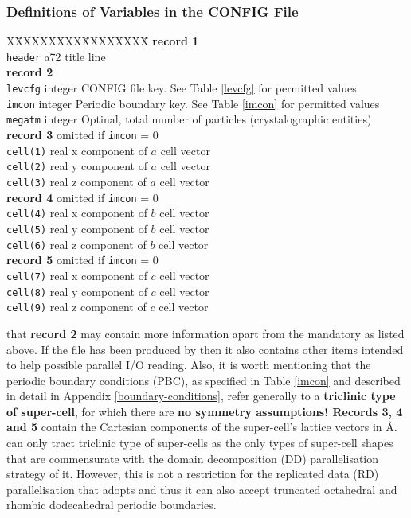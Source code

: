 \subsubsection{Definitions of Variables in the CONFIG File}

\begin{tabbing}
X\=XXXXXXXX\=XXXXXXXX\=\kill
{\bf record 1} \\
\> {\tt header}  \> a72     \> title line \\
{\bf record 2} \\
\> {\tt levcfg}  \> integer \> CONFIG file key.  See Table \ref{levcfg} for permitted values \\
\> {\tt imcon}   \> integer \> Periodic boundary key. See Table \ref{imcon} for permitted values \\
\> {\tt megatm}  \> integer \> Optinal, total number of particles (crystalographic entities) \\
{\bf record 3}   \>         \> omitted if {\tt imcon} = 0 \\
\> {\tt cell(1)} \> real    \> x component of $a$ cell vector \\
\> {\tt cell(2)} \> real    \> y component of $a$ cell vector \\
\> {\tt cell(3)} \> real    \> z component of $a$ cell vector \\
{\bf record 4}   \>         \> omitted if {\tt imcon} = 0 \\
\> {\tt cell(4)} \> real    \> x component of $b$ cell vector \\
\> {\tt cell(5)} \> real    \> y component of $b$ cell vector \\
\> {\tt cell(6)} \> real    \> z component of $b$ cell vector \\
{\bf record 5}   \>         \> omitted if {\tt imcon} = 0 \\
\> {\tt cell(7)} \> real    \> x component of $c$ cell vector \\
\> {\tt cell(8)} \> real    \> y component of $c$ cell vector \\
\> {\tt cell(9)} \> real    \> z component of $c$ cell vector
\end{tabbing}
 that {\bf record 2} may contain more information
apart from the mandatory as listed above.  If the file has been
produced by \D then it also contains other items intended to help
possible parallel I/O reading. Also, it is worth mentioning that the
periodic boundary conditions (PBC), as specified in Table \ref{imcon}
and described in detail in Appendix \ref{boundary-conditions}, refer
generally to a {\bf triclinic type of super-cell}, for which there
are {\bf no symmetry assumptions!  Records 3, 4 and 5} contain the
Cartesian components of the super-cell's lattice vectors in \AA.
\D can only tract triclinic type of super-cells as the only types
of super-cell shapes that are commensurate with the domain decomposition
(DD) parallelisation strategy of it.  However, this is not a restriction
for the replicated data (RD) parallelisation that \C adopts and thus
it can also accept truncated octahedral and rhombic dodecahedral
periodic boundaries.

